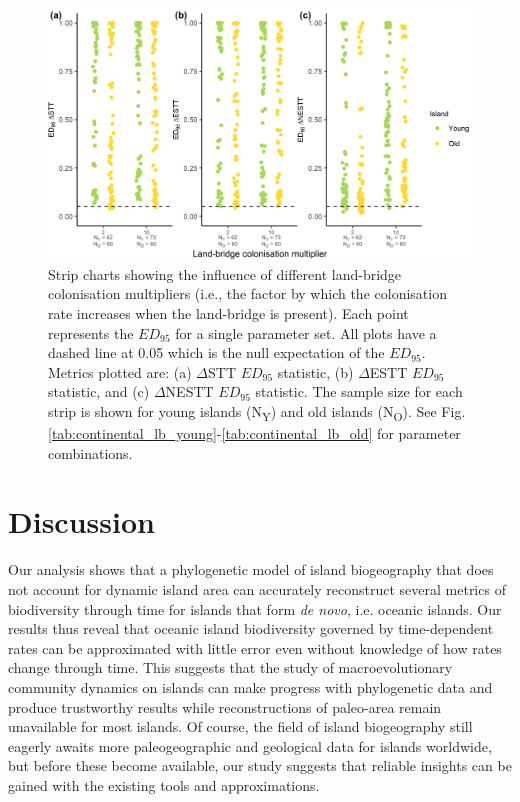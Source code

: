 \documentclass{article}
\begin{document}
\begin{figure}
    \centering
    \includegraphics[width=\textwidth]{Land-bridge colonisation multiplier_spec_nltt.png}
    \caption{Strip charts showing the influence of different land-bridge colonisation multipliers (i.e., the factor by which the colonisation rate increases when the land-bridge is present). Each point represents the $ED_{95}$ for a single parameter set. All plots have a dashed line at 0.05 which is the null expectation of the $ED_{95}$. Metrics plotted are: (a) $\Delta$STT $ED_{95}$ statistic, (b) $\Delta$ESTT $ED_{95}$ statistic, and (c) $\Delta$NESTT $ED_{95}$ statistic. The sample size for each strip is shown for young islands (N\textsubscript{Y}) and old islands (N\textsubscript{O}). See Fig. \ref{tab:continental_lb_young}-\ref{tab:continental_lb_old} for parameter combinations.}
    \label{fig:Land-bridge colonisation multiplier_spec_nltt}
\end{figure}

\clearpage

\section*{Discussion}

Our analysis shows that a phylogenetic model of island biogeography that does not account for dynamic island area can accurately reconstruct several metrics of biodiversity through time for islands that form \textit{de novo}, i.e. oceanic islands. Our results thus reveal that oceanic island biodiversity governed by time-dependent rates can be approximated with little error even without knowledge of how rates change through time. This suggests that the study of macroevolutionary community dynamics on islands can make progress with phylogenetic data and produce trustworthy results while reconstructions of paleo-area remain unavailable for most islands. Of course, the field of island biogeography still eagerly awaits more paleogeographic and geological data for islands worldwide, but before these become available, our study suggests that reliable insights can be gained with the existing tools and approximations. \\
\end{document}
